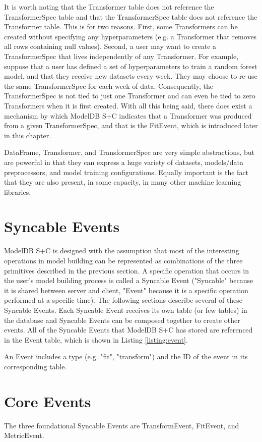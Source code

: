 It is worth noting that the Transformer table does not reference the TransformerSpec
table and that the TransformerSpec table does not reference the Transformer table. This
is for two reasons. First, some Transformers can be created without specifying any
hyperparameters (e.g. a Transformer that removes all rows containing null values). 
Second, a user may want to create a TransformerSpec that lives independently of any
Transformer. For example, suppose that a user has defined a set of hyperparameters to
train a random forest model, and that they receive new datasets every week. They may choose
to re-use the same TransformerSpec for each week of data. Consequently, the TransformerSpec is
not tied to just one Transformer and can even be tied to zero Transformers when it is first created. With
all this being said, there does exist a mechanism by which ModelDB S+C indicates that a Transformer
was produced from a given TransformerSpec, and that is the FitEvent, which is introduced later in
this chapter.

DataFrame, Transformer, and TransformerSpec are very simple abstractions, but are powerful in that
they can express a huge variety of datasets, models/data preprocessors, and model training configurations.
Equally important is the fact that they are also present, in some capacity, in many other machine learning
libraries.

\section{Syncable Events}
ModelDB S+C is designed with the assumption that most of the interesting operations in
model building can be represented as combinations of the three primitives described in the
previous section. A specific operation that occurs in the user's model building process
is called a Syncable Event ("Syncable" because it is shared between server and client, 
"Event" because it is a specific operation performed at a specific time). The following
sections describe several of these Syncable Events. Each Syncable Event receives its own
table (or few tables) in the database and Syncable Events can be composed together to
create other events. All of the Syncable Events that ModelDB S+C has stored
are referenced in the Event table, which is shown in Listing \ref{listing:event}.

An Event includes a type (e.g. "fit", "transform") and the ID of the event
in its corresponding table.

\section{Core Events}
The three foundational Syncable Events are TransformEvent, FitEvent, and MetricEvent.

